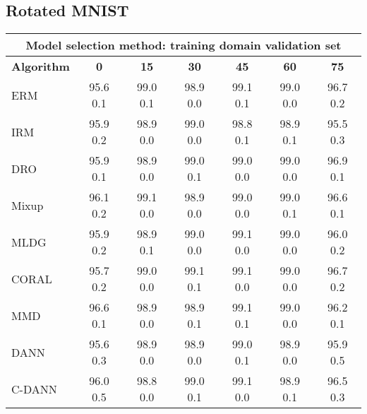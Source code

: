 \documentclass{article}
\begin{document}
\subsection{Rotated MNIST}
\begin{center}
\begin{tabular}{lcccccc}
\toprule
\multicolumn{7}{c}{\textbf{Model selection method: training domain validation set}} \\
\midrule
\textbf{Algorithm}    & \textbf{0}      & \textbf{15}     & \textbf{30}     & \textbf{45}     & \textbf{60}     & \textbf{75}     \\
\midrule
ERM                       & 95.6  0.1            & 99.0  0.1            & 98.9  0.0            & 99.1  0.1            & 99.0  0.0            & 96.7  0.2            \\
IRM                       & 95.9  0.2            & 98.9  0.0            & 99.0  0.0            & 98.8  0.1            & 98.9  0.1            & 95.5  0.3            \\
DRO                 & 95.9  0.1            & 98.9  0.0            & 99.0  0.1            & 99.0  0.0            & 99.0  0.0            & 96.9  0.1            \\
Mixup                     & 96.1  0.2            & 99.1  0.0            & 98.9  0.0            & 99.0  0.0            & 99.0  0.1            & 96.6  0.1            \\
MLDG                      & 95.9  0.2            & 98.9  0.1            & 99.0  0.0            & 99.1  0.0            & 99.0  0.0            & 96.0  0.2            \\
CORAL                     & 95.7  0.2            & 99.0  0.0            & 99.1  0.1            & 99.1  0.0            & 99.0  0.0            & 96.7  0.2            \\
MMD                       & 96.6  0.1            & 98.9  0.0            & 98.9  0.1            & 99.1  0.1            & 99.0  0.0            & 96.2  0.1            \\
DANN                       & 95.6  0.3            & 98.9  0.0            & 98.9  0.0            & 99.0  0.1            & 98.9  0.0            & 95.9  0.5            \\
C-DANN                   & 96.0  0.5            & 98.8  0.0            & 99.0  0.1            & 99.1  0.0            & 98.9  0.1            & 96.5  0.3            \\
\bottomrule
\end{tabular}
\end{center}
\end{document}
